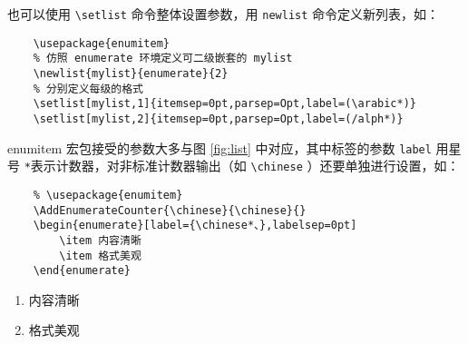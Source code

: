 也可以使用 \verb|\setlist| 命令整体设置参数，用 \verb|newlist| 命令定义新列表，如：

\begin{lstlisting}
    \usepackage{enumitem}
    % 仿照 enumerate 环境定义可二级嵌套的 mylist
    \newlist{mylist}{enumerate}{2}
    % 分别定义每级的格式
    \setlist[mylist,1]{itemsep=0pt,parsep=Opt,label=(\arabic*)}
    \setlist[mylist,2]{itemsep=0pt,parsep=Opt,label=(/alph*)}
\end{lstlisting}

enumitem 宏包接受的参数大多与图 \ref{fig:list} 中对应，其中标签的参数 \verb|label| 用星号 \verb|*|表示计数器，对非标准计数器输出（如 \verb|\chinese| ）还要单独进行设置，如：

\begin{lstlisting}
    % \usepackage{enumitem}
    \AddEnumerateCounter{\chinese}{\chinese}{}
    \begin{enumerate}[label={\chinese*、},labelsep=0pt]
        \item 内容清晰
        \item 格式美观
    \end{enumerate}
\end{lstlisting}

\AddEnumerateCounter{\chinese}{\chinese}{}
\begin{enumerate}[label={\chinese*、},labelsep=0pt]
    \item 内容清晰
    \item 格式美观
\end{enumerate}